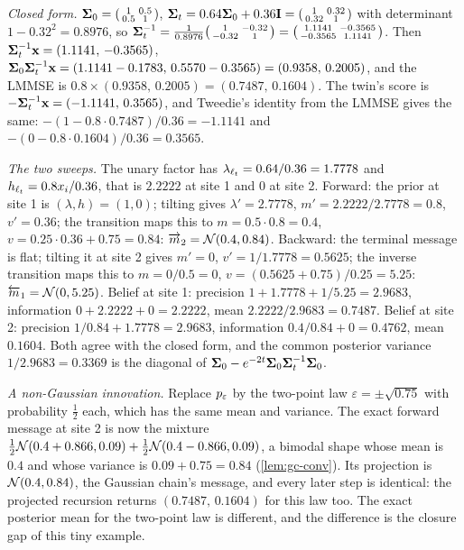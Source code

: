 \emph{Closed form.} $\mathbf{\Sigma}_0=\begin{psmallmatrix}1&0.5\\0.5&1\end{psmallmatrix}$,
$\mathbf{\Sigma}_t=0.64\mathbf{\Sigma}_0+0.36\mathbf{I}=\begin{psmallmatrix}1&0.32\\0.32&1\end{psmallmatrix}$ with
determinant $1-0.32^2=0.8976$, so
$\mathbf{\Sigma}_t^{-1}=\tfrac{1}{0.8976}\begin{psmallmatrix}1&-0.32\\-0.32&1\end{psmallmatrix}
=\begin{psmallmatrix}1.1141&-0.3565\\-0.3565&1.1141\end{psmallmatrix}$. Then
$\mathbf{\Sigma}_t^{-1}\mathbf{x}=(1.1141,\,-0.3565)$, $\mathbf{\Sigma}_0\mathbf{\Sigma}_t^{-1}\mathbf{x}=(1.1141-0.1783,\,0.5570-0.3565)=(0.9358,\,0.2005)$,
and the LMMSE is $0.8\times(0.9358,\,0.2005)=(0.7487,\,0.1604)$. The twin's score is
$-\mathbf{\Sigma}_t^{-1}\mathbf{x}=(-1.1141,\,0.3565)$, and Tweedie's identity from the LMMSE gives the
same: $-(1-0.8\cdot0.7487)/0.36=-1.1141$ and $-(0-0.8\cdot0.1604)/0.36=0.3565$.

\emph{The two sweeps.} The unary factor has $\lambda_{\ell_t}=0.64/0.36=1.7778$ and
$h_{\ell_t}=0.8x_i/0.36$, that is $2.2222$ at site 1 and $0$ at site 2. Forward: the
prior at site 1 is $(\lambda,h)=(1,0)$; tilting gives $\lambda'=2.7778$, $m'=2.2222/2.7778=0.8$,
$v'=0.36$; the transition maps this to $m=0.5\cdot0.8=0.4$, $v=0.25\cdot0.36+0.75=0.84$:
$\overrightarrow{m}_2=\mathcal{N}\!\left(0.4,0.84\right)$. Backward: the terminal message is flat; tilting it at
site 2 gives $m'=0$, $v'=1/1.7778=0.5625$; the inverse transition maps this to
$m=0/0.5=0$, $v=(0.5625+0.75)/0.25=5.25$: $\overleftarrow{m}_1=\mathcal{N}\!\left(0,5.25\right)$. Belief at site 1:
precision $1+1.7778+1/5.25=2.9683$, information $0+2.2222+0=2.2222$, mean
$2.2222/2.9683=0.7487$. Belief at site 2: precision $1/0.84+1.7778=2.9683$, information
$0.4/0.84+0=0.4762$, mean $0.1604$. Both agree with the closed form, and the common
posterior variance $1/2.9683=0.3369$ is the diagonal of $\mathbf{\Sigma}_0-e^{-2t}\mathbf{\Sigma}_0\mathbf{\Sigma}_t^{-1}\mathbf{\Sigma}_0$.

\emph{A non-Gaussian innovation.} Replace $p_{\varepsilon}$ by the two-point law
$\varepsilon=\pm\sqrt{0.75}$ with probability $\tfrac12$ each, which has the same mean and
variance. The exact forward message at site 2 is now the mixture
$\tfrac12\mathcal{N}\!\left(0.4+0.866,0.09\right)+\tfrac12\mathcal{N}\!\left(0.4-0.866,0.09\right)$, a bimodal shape whose
mean is $0.4$ and whose variance is $0.09+0.75=0.84$ (\cref{lem:gc-conv}). Its projection
is $\mathcal{N}\!\left(0.4,0.84\right)$, the Gaussian chain's message, and every later step is identical:
the projected recursion returns $(0.7487,\,0.1604)$ for this law too. The exact
posterior mean for the two-point law is different, and the difference is the closure
gap of this tiny example.

